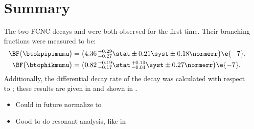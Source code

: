 \section{Summary}
\label{sec:hhh:conc}

The two FCNC decays \btokpipimumu and \btophikmumu were both observed for the first time.
Their branching fractions were measured to be:
\begin{align*}
  \BF\big( \btokpipimumu \big)&=
  \big(4.36\,^{+0.29}_{-0.27}\stat\pm0.21\syst\pm0.18\normerr\big)\e{-7}, \\
  \BF\big(\btophikmumu\big)&=
  \big(0.82\,^{+0.19}_{-0.17}\stat\,^{+0.10}_{-0.04}\syst\pm0.27\normerr\big)\e{-7}.
\end{align*}
Additionally, the differential decay rate of the decay \btokpipimumu was calculated with respect to
\qsq; these results are given in  and shown in .

\begin{itemize}
  \item Could in future normalize to \decay{\Bp}{\jpsi\Kstar}
  \item Good to do resonant analysis, like in \decay{\Bp}{\kpipi\gamma}
\end{itemize}


